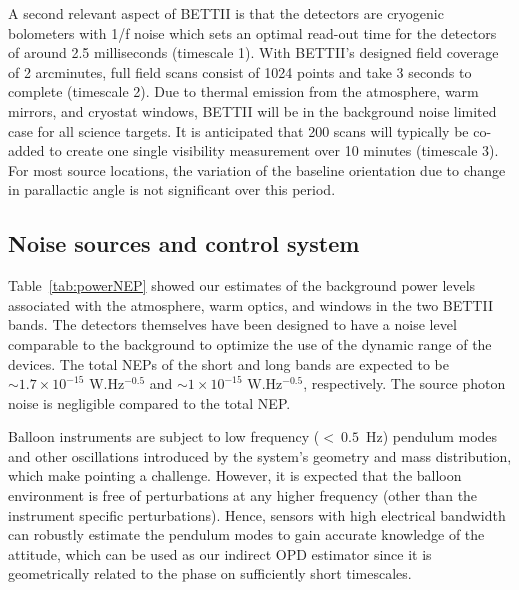 A second relevant aspect of BETTII is that the detectors are cryogenic bolometers \cite[see][for similar architectures]{Staguhn:2014kl} with 1/f noise which
sets an optimal read-out time for the detectors of around 2.5 milliseconds (timescale 1). With BETTII's designed field coverage
of 2 arcminutes, full field scans consist of 1024 points and take 3 seconds to complete (timescale 2). Due to thermal emission from the atmosphere,
warm mirrors, and cryostat windows, BETTII will be in the background noise limited case for all science targets.
It is anticipated that 200 scans will typically be co-added to create one single visibility measurement over 10 minutes (timescale 3). 
For most source locations, the variation of the baseline orientation due to change in parallactic angle is not significant over this period.

\subsection{Noise sources and control system}
Table~\ref{tab:powerNEP} showed our estimates of the
background power levels associated with the atmosphere, warm optics, and windows in the two BETTII bands. 
The detectors themselves have been designed to have a noise level comparable to the background to optimize the use of the
dynamic range of the devices. The total NEPs of the short and long bands are expected to be $\sim 1.7\times 10^{-15}$ W.Hz$^{-0.5}$ and $\sim 1\times 10^{-15}$ W.Hz$^{-0.5}$, respectively. The source photon noise is negligible compared to the total NEP. 

Balloon instruments are subject to low frequency ($<~0.5$~Hz) pendulum modes and other oscillations introduced by the system's geometry and mass distribution, which make pointing a challenge. However, it is expected that the balloon environment is free of perturbations at any higher frequency (other than the instrument specific perturbations). Hence, sensors with high electrical bandwidth can robustly estimate the pendulum modes to gain accurate knowledge of the attitude, which can be used as our indirect OPD estimator since it is geometrically related to the phase on sufficiently short timescales.

